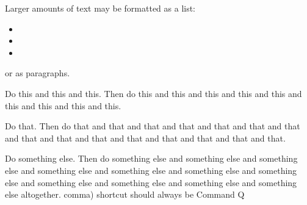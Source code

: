 Larger amounts of text may be formatted as a list:
\begin{itemize}
\item {} 
\item {} 
\item {}
\end{itemize}
or as paragraphs.

\nix{}Do this and this and this. Then do this
and this and this
and this and this
and this and this
and this and this.

\win{}Do that. Then do that
and that and that
and that and that
and that and that
and that and that
and that and that
and that and that
and that and that.

\osx{}Do something else. 
Then do something else and 
something else and
something else and
something else and
something else and
something else and
something else and
something else and
something else and
something else and
something else altogether.
comma)
shortcut should always be Command Q




